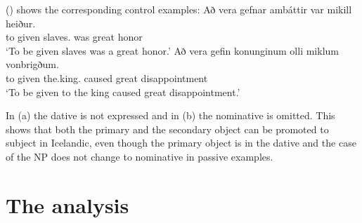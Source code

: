 \noindent
() shows the corresponding control examples:
\eal
\ex
\gll Að vera gefnar ambáttir var mikill heiður.\\
     to \AUX{} given slaves.\NOM{} was great honor\\\icelandic
\glt `To be given slaves was a great honor.'
\ex
\gll Að vera gefin konunginum olli miklum vonbrigðum.\\
     to \AUX{} given the.king.\DAT{} caused great disappointment\\
\glt `To be given to the king caused great disappointment.'

\zl
In (a) the dative is not expressed and in (b) the nominative is omitted. This shows
that both the primary and the secondary object can be promoted to subject in Icelandic, even though
the primary object is in the dative and the case of the NP does not change to nominative in passive examples.














\section{The analysis}

